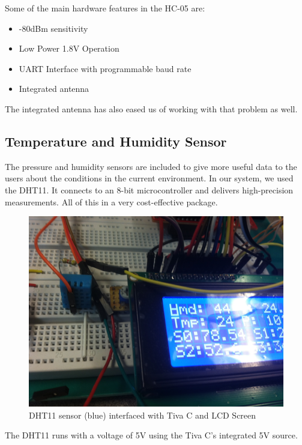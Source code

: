 		Some of the main hardware features in the HC-05 are:
		
		\begin{itemize}
		 \item -80dBm sensitivity
		 \item Low Power 1.8V Operation
		 \item UART Interface with programmable baud rate
		 \item Integrated antenna
        \end{itemize}
        
       	The integrated antenna has also eased us of working with that problem as well. 	
		
		\subsection{Temperature and Humidity Sensor}
		
		The pressure and humidity sensors are included to give more useful data to the users about the conditions in the current environment. In our system, we used the DHT11. It connects to an 8-bit microcontroller and delivers high-precision measurements. All of this in a very cost-effective package. 
		
		\begin{figure}[H]
			\centering
				\includegraphics[scale=0.45]{img/DHT11}
			\caption{DHT11 sensor (blue) interfaced with Tiva C and LCD Screen}
		\end{figure}
		
		The DHT11 runs with a voltage of 5V using the Tiva C's integrated 5V source.
		
